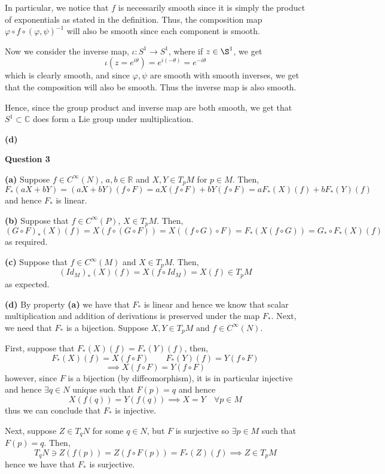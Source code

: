 \documentclass[10pt]{article}
\newcommand{\R}{\mathbb{R}}
\newcommand{\C}{\mathbb{C}}
\begin{document}
In particular, we notice that $f$ is necessarily smooth since it is simply the product of exponentials as stated in the definition. Thus, the composition map $\varphi \circ f \circ (\varphi,\psi)^{-1}$ will also be smooth since each component is smooth.

Now we consider the inverse map, $\iota: S^{1} \to S^{1}$, where if $z\in \S^{1}$, we get
$$\iota(z = e^{i\theta}) = e^{i(-\theta)} = e^{-i\theta}$$
which is clearly smooth, and since $\varphi,\psi$ are smooth with smooth inverses, we get that the composition will also be smooth. Thus the inverse map is also smooth.

Hence, since the group product and inverse map are both smooth, we get that $S^{1}\subset \C$ does form a Lie group under multiplication.

\textbf{(d)}
\newpage

\textbf{Question 3}

\textbf{(a)} Suppose $f\in C^{\infty}(N)$, $a,b \in \R$ and $X,Y\in T_{p}M$ for $p\in M$. Then,
$$F_{*}(aX + bY) = (aX + bY)(f\circ F) = aX(f\circ F) + bY(f\circ F) = aF_{*}(X)(f) + bF_{*}(Y)(f)$$
and hence $F_{*}$ is linear.

\textbf{(b)} Suppose that $f\in C^{\infty}(P)$, $X\in T_{p}M$. Then,
$$(G\circ F)_{*}(X)(f) = X(f\circ (G\circ F)) = X((f\circ G)\circ F) = F_{*}(X(f\circ G)) = G_{*}\circ F_{*}(X)(f)$$
as required.

\textbf{(c)} Suppose that $f\in C^{\infty}(M)$ and $X\in T_{p}M$. Then,
$$(Id_{M})_{*}(X)(f) = X(f\circ Id_{M}) = X(f) \in T_{p}M$$
as expected.

\textbf{(d)} By property \textbf{(a)} we have that $F_{*}$ is linear and hence we know that scalar multiplication and addition of derivations is preserved under the map $F_{*}$. Next, we need that $F_{*}$ is a bijection. Suppose $X,Y\in T_{p}M$ and $f\in C^{\infty}(N)$. 

First, suppose that $F_{*}(X)(f) = F_{*}(Y)(f)$, then,
$$F_{*}(X)(f) = X(f\circ F) \hspace{2em} F_{*}(Y)(f) = Y(f\circ F)$$
$$\implies X(f\circ F) = Y(f\circ F)$$
however, since $F$ is a bijection (by diffeomorphism), it is in particular injective and hence $\exists q \in N$ unique such that $F(p) = q$ and hence 
$$X(f(q)) = Y(f(q))\implies X = Y \hspace{1em}\forall p\in M$$
thus we can conclude that $F_{*}$ is injective.

Next, suppose $Z\in T_{q}N$ for some $q\in N$, but $F$ is surjective so $\exists p \in M$ such that $F(p) = q$. Then,
$$T_{q}N \ni Z(f(p)) = Z(f\circ F(p)) = F_{*}(Z)(f) \implies Z \in T_{p}M$$
hence we have that $F_{*}$ is surjective.
\end{document}
